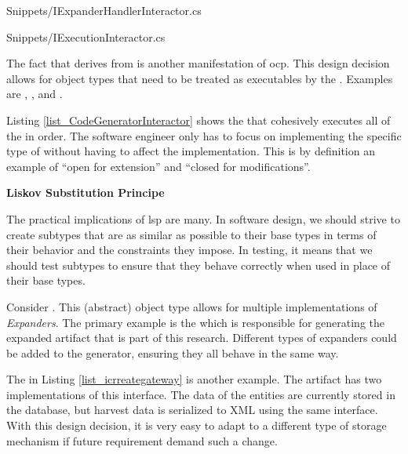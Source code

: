 
    {Snippets/IExpanderHandlerInteractor.cs}


    {Snippets/IExecutionInteractor.cs}

The fact that  derives from
 is another manifestation of \gls{ocp}. This
design decision allows for object types that need to be treated as executables by the
. Examples are
,
,
 and
. 

Listing \ref{list_CodeGeneratorInteractor} shows the
 that cohesively executes all of the
 in order. The software engineer only has to focus on
implementing the specific type of  without having to
affect the implementation. This is by definition an example of \enquote{open for
extension} and \enquote{closed for modifications}.

\textbf{Liskov Substitution Principe}

The practical implications of \gls{lsp} are many. In software design, we should strive to
create subtypes that are as similar as possible to their base types in terms of their
behavior and the constraints they impose. In testing, it means that we should test
subtypes to ensure that they behave correctly when used in place of their base types.

Consider . This (abstract) object type allows for
multiple implementations of \textit{Expanders}. The primary example is the
 which is responsible for generating the
expanded artifact that is part of this research. Different types of expanders could be
added to the generator, ensuring they all behave in the same way.

The  in Listing \ref{list_icrreategateway} is another
example. The artifact has two implementations of this interface. The data of the entities
are currently stored in the database, but harvest data is serialized to XML using the same
 interface. With this design decision, it is very easy to adapt
to a different type of storage mechanism if future requirement demand such a change.

